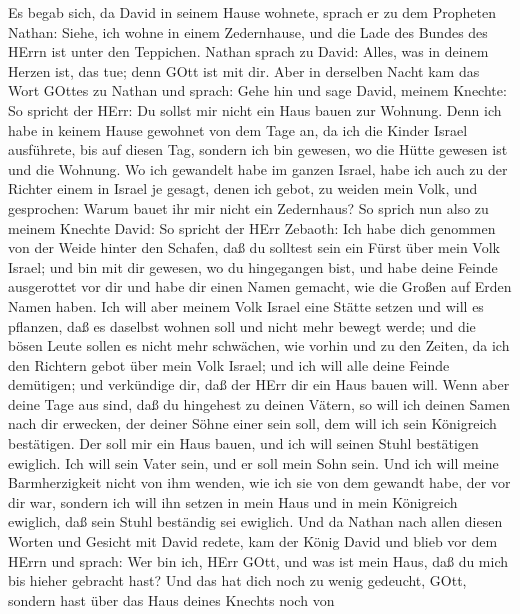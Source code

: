  Es begab sich, da David in seinem Hause wohnete, sprach er
zu dem Propheten Nathan: Siehe, ich wohne in einem Zedernhause, und die
Lade des Bundes des HErrn ist unter den Teppichen.  Nathan
sprach zu David: Alles, was in deinem Herzen ist, das tue; denn GOtt ist
mit dir.  Aber in derselben Nacht kam das Wort GOttes zu
Nathan und sprach:  Gehe hin und sage David, meinem Knechte:
So spricht der HErr: Du sollst mir nicht ein Haus bauen zur Wohnung.
 Denn ich habe in keinem Hause gewohnet von dem Tage an, da
ich die Kinder Israel ausführete, bis auf diesen Tag, sondern ich bin
gewesen, wo die Hütte gewesen ist und die Wohnung.  Wo ich
gewandelt habe im ganzen Israel, habe ich auch zu der Richter einem in
Israel je gesagt, denen ich gebot, zu weiden mein Volk, und gesprochen:
Warum bauet ihr mir nicht ein Zedernhaus?  So sprich nun
also zu meinem Knechte David: So spricht der HErr Zebaoth: Ich habe dich
genommen von der Weide hinter den Schafen, daß du solltest sein ein
Fürst über mein Volk Israel;  und bin mit dir gewesen, wo du
hingegangen bist, und habe deine Feinde ausgerottet vor dir und habe dir
einen Namen gemacht, wie die Großen auf Erden Namen haben. 
Ich will aber meinem Volk Israel eine Stätte setzen und will es
pflanzen, daß es daselbst wohnen soll und nicht mehr bewegt werde; und
die bösen Leute sollen es nicht mehr schwächen, wie vorhin 
und zu den Zeiten, da ich den Richtern gebot über mein Volk Israel; und
ich will alle deine Feinde demütigen; und verkündige dir, daß der HErr
dir ein Haus bauen will.  Wenn aber deine Tage aus sind,
daß du hingehest zu deinen Vätern, so will ich deinen Samen nach dir
erwecken, der deiner Söhne einer sein soll, dem will ich sein Königreich
bestätigen.  Der soll mir ein Haus bauen, und ich will
seinen Stuhl bestätigen ewiglich.  Ich will sein Vater
sein, und er soll mein Sohn sein. Und ich will meine Barmherzigkeit
nicht von ihm wenden, wie ich sie von dem gewandt habe, der vor dir war,
 sondern ich will ihn setzen in mein Haus und in mein
Königreich ewiglich, daß sein Stuhl beständig sei ewiglich.
 Und da Nathan nach allen diesen Worten und Gesicht mit
David redete,  kam der König David und blieb vor dem HErrn
und sprach: Wer bin ich, HErr GOtt, und was ist mein Haus, daß du mich
bis hieher gebracht hast?  Und das hat dich noch zu wenig
gedeucht, GOtt, sondern hast über das Haus deines Knechts noch von
